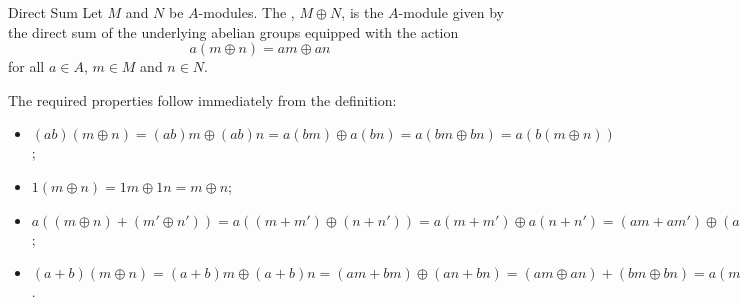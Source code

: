 \documentclass[fleqn]{NotesClass}
\begin{document}
    \begin{dfn}{Direct Sum}{}
        Let \(M\) and \(N\) be \(A\)-modules.
        The , \(M \oplus N\), is the \(A\)-module given by the direct sum of the underlying abelian groups equipped with the action
        \begin{equation}
            a(m \oplus n) = am \oplus an
        \end{equation}
        for all \(a \in A\), \(m \in M\) and \(n \in N\).
    \end{dfn}
    
    The required properties follow immediately from the definition:
    \begin{itemize}
        \item[M1] \((ab)(m \oplus n) = (ab)m \oplus (ab)n = a(bm) \oplus a(bn) = a(bm \oplus bn) = a(b(m \oplus n))\);
        \item[M2] \(1(m \oplus n) = 1m \oplus 1n = m \oplus n\);
        \item[M3] \(a((m \oplus n) + (m' \oplus n')) = a((m + m') \oplus (n + n')) = a(m + m') \oplus a(n + n') = (am + am') \oplus (an + an') = (am \oplus an) + (am' \oplus an') = a(m \oplus n) + a(m' \oplus n')\);
        \item[M4] \((a + b)(m \oplus n) = (a + b)m \oplus (a + b)n = (am + bm) \oplus (an + bn) = (am \oplus an) + (bm \oplus bn) = a(m \oplus n) + b(m \oplus n)\).
    \end{itemize}
    
%	

    \backmatter
    \renewcommand{\glossaryname}{Acronyms}
    \printglossary[acronym]
    \printindex
\end{document}
